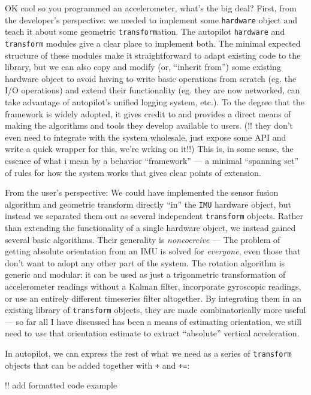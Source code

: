 \documentclass{article}
\begin{document}
OK cool so you programmed an accelerometer, what's the big deal? First,
from the developer's perspective: we needed to implement some
\texttt{hardware} object and teach it about some geometric
\texttt{transform}ation. The autopilot \texttt{hardware} and
\texttt{transform} modules give a clear place to implement both. The
minimal expected structure of these modules make it straightforward to
adapt existing code to the library, but we can also copy and modify (or,
``inherit from'') some existing hardware object to avoid having to write
basic operations from scratch (eg. the I/O operations) and extend their
functionality (eg. they are now networked, can take advantage of
autopilot's unified logging system, etc.). To the degree that the
framework is widely adopted, it gives credit to and provides a direct
means of making the algorithms and tools they develop available to
users. (!! they don't even need to integrate with the system wholesale,
just expose some API and write a quick wrapper for this, we're wrking on
it!!) This is, in some sense, the essence of what i mean by a behavior
``framework'' --- a minimal ``spanning set'' of rules for how the system
works that gives clear points of extension.

From the user's perspective: We could have implemented the sensor fusion
algorithm and geometric transform directly ``in'' the \texttt{IMU}
hardware object, but instead we separated them out as several
independent \texttt{transform} objects. Rather than extending the
functionality of a single hardware object, we instead gained several
basic algorithms. Their generality is \emph{noncoercive} --- The problem
of getting absolute orientation from an IMU is solved for
\emph{everyone}, even those that don't want to adopt any other part of
the system. The rotation algorithm is generic and modular: it can be
used as just a trigonmetric transformation of accelerometer readings
without a Kalman filter, incorporate gyroscopic readings, or use an
entirely different timeseries filter altogether. By integrating them in
an existing library of \texttt{transform} objects, they are made
combinatorically more useful --- so far all I have discussed has been a
means of estimating orientation, we still need to \emph{use} that
orientation estimate to extract ``absolute'' vertical acceleration.

In autopilot, we can express the rest of what we need as a series of
\texttt{transform} objects that can be added together with \texttt{+}
and \texttt{+=}:

!! add formatted code example
\end{document}
